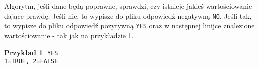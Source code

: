 \documentclass[a4paper,10pt,twoside]{report}
\theoremstyle{definition}
\newtheorem{example}[theorem]{Przykład}
\begin{document}
Algorytm, jeśli dane będą poprawne, sprawdzi, czy istnieje jakieś wartościowanie dające prawdę. Jeśli nie, to wypisze do pliku odpowiedź negatywną \verb|NO|. Jeśli tak, to wypisze do pliku odpowiedź pozytywną \verb|YES| oraz w następnej linijce znalezione wartościowanie - tak jak na przykładzie \ref{exp:przyklad_wyjscia}.

\begin{example} \hfill

\noindent
\verb|YES| \\
\verb|1=TRUE, 2=FALSE|
\label{exp:przyklad_wyjscia}
\end{example}

\clearpage
\pagestyle{empty}
\printbibliography
\end{document}
